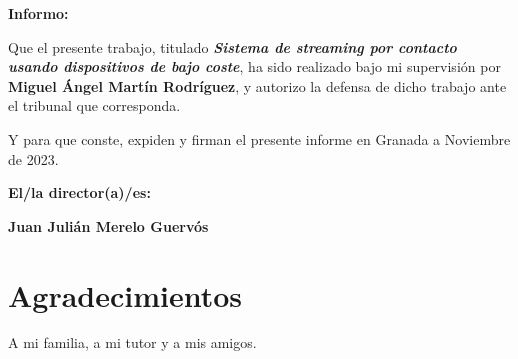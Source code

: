 \vspace{0.5cm}

\textbf{Informo:}

\vspace{0.5cm}

Que el presente trabajo, titulado \textit{\textbf{Sistema de streaming por contacto usando dispositivos de bajo coste}},
ha sido realizado bajo mi supervisión por \textbf{Miguel Ángel Martín Rodríguez}, y autorizo la defensa de dicho trabajo ante el tribunal
que corresponda.

\vspace{0.5cm}

Y para que conste, expiden y firman el presente informe en Granada a Noviembre de 2023.

\vspace{1cm}

\textbf{El/la director(a)/es: }

\vspace{5cm}

\noindent \textbf{Juan Julián Merelo Guervós}

\chapter*{Agradecimientos}

A mi familia, a mi tutor y a mis amigos.


